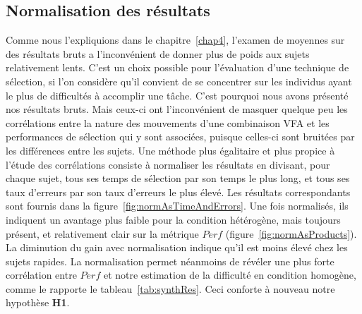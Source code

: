 	\subsection{Normalisation des résultats}
	Comme nous l'expliquions dans le chapitre~\ref{chap4}, l'examen de moyennes sur des résultats bruts a l'inconvénient de donner plus de poids aux sujets relativement lents. C'est un choix possible pour l'évaluation d'une technique de sélection, si l'on considère qu'il convient de se concentrer sur les individus ayant le plus de difficultés à accomplir une tâche. C'est pourquoi nous avons présenté nos résultats bruts. Mais ceux-ci ont l'inconvénient de masquer quelque peu les corrélations entre la nature des mouvements d'une combinaison VFA et les performances de sélection qui y sont associées, puisque celles-ci sont \og bruitées \fg{} par les différences entre les sujets. Une méthode plus égalitaire et plus propice à l'étude des corrélations consiste à normaliser les résultats en divisant, pour chaque sujet, tous ses temps de sélection par son temps le plus long, et tous ses taux d'erreurs par son taux d'erreurs le plus élevé. Les résultats correspondants sont fournis dans la figure~\ref{fig:normAsTimeAndErrors}. Une fois normalisés, ils indiquent un avantage plus faible pour la condition hétérogène, mais toujours présent, et relativement clair sur la métrique $Perf$ (figure~\ref{fig:normAsProducts}). La diminution du gain avec normalisation indique qu'il est moins élevé chez les sujets rapides. La normalisation permet néanmoins de révéler une plus forte corrélation entre $Perf$ et notre estimation de la difficulté en condition homogène, comme le rapporte le tableau~\ref{tab:synthRes}. Ceci conforte à nouveau notre hypothèse \textbf{H1}.
	

